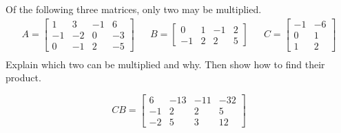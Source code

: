 
\begin{exerciseStatement}


Of the following three matrices, only two may be multiplied. 
\begin{align*} A= \left[\begin{array}{cccc}
1 & 3 & -1 & 6 \\
-1 & -2 & 0 & -3 \\
0 & -1 & 2 & -5
\end{array}\right]  & & B= \left[\begin{array}{cccc}
0 & 1 & -1 & 2 \\
-1 & 2 & 2 & 5
\end{array}\right]  & & C= \left[\begin{array}{cc}
-1 & -6 \\
0 & 1 \\
1 & 2
\end{array}\right]  \\ \end{align*}
             Explain which two can be multiplied and why. Then show how to find their product.


\end{exerciseStatement}
    
\begin{exerciseAnswer} 
\[CB= \left[\begin{array}{cccc}
6 & -13 & -11 & -32 \\
-1 & 2 & 2 & 5 \\
-2 & 5 & 3 & 12
\end{array}\right] \]
\end{exerciseAnswer}
    
